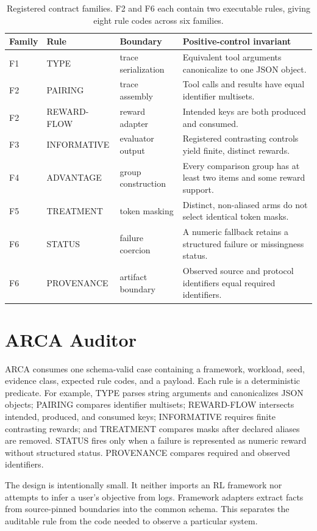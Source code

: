 \documentclass[10pt]{article}
\newcommand{\arca}{\textsc{ARCA}}
\begin{document}
\begin{table}[t]
\centering
\small
\caption{Registered contract families.  F2 and F6 each contain two executable
rules, giving eight rule codes across six families.}
\label{tab:taxonomy}
\begin{tabularx}{\textwidth}{@{}lllX@{}}
\toprule
Family & Rule & Boundary & Positive-control invariant \\
\midrule
F1 & TYPE & trace serialization & Equivalent tool arguments canonicalize to one JSON object. \\
F2 & PAIRING & trace assembly & Tool calls and results have equal identifier multisets. \\
F2 & REWARD-FLOW & reward adapter & Intended keys are both produced and consumed. \\
F3 & INFORMATIVE & evaluator output & Registered contrasting controls yield finite, distinct rewards. \\
F4 & ADVANTAGE & group construction & Every comparison group has at least two items and some reward support. \\
F5 & TREATMENT & token masking & Distinct, non-aliased arms do not select identical token masks. \\
F6 & STATUS & failure coercion & A numeric fallback retains a structured failure or missingness status. \\
F6 & PROVENANCE & artifact boundary & Observed source and protocol identifiers equal required identifiers. \\
\bottomrule
\end{tabularx}
\end{table}

\section{ARCA Auditor}

\arca{} consumes one schema-valid case containing a framework, workload,
seed, evidence class, expected rule codes, and a payload.  Each rule is a
deterministic predicate.  For example, TYPE parses string arguments and
canonicalizes JSON objects; PAIRING compares identifier multisets;
REWARD-FLOW intersects intended, produced, and consumed keys; INFORMATIVE
requires finite contrasting rewards; and TREATMENT compares masks after
declared aliases are removed.  STATUS fires only when a failure is represented
as numeric reward without structured status.  PROVENANCE compares required
and observed identifiers.

The design is intentionally small.  It neither imports an RL framework nor
attempts to infer a user's objective from logs.  Framework adapters extract
facts from source-pinned boundaries into the common schema.  This separates
the auditable rule from the code needed to observe a particular system.
\end{document}
